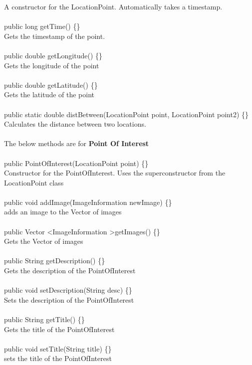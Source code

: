 \documentclass[12pt]{article}
\begin{document}
A constructor for the LocationPoint. Automatically takes a timestamp.~\\\\
public long getTime() \{\} ~\\
Gets the timestamp of the point. ~\\\\
public double getLongitude() \{\}~\\
Gets the longitude of the point ~\\\\
public double getLatitude() \{\} ~\\
Gets the latitude of the point~\\\\
public static double distBetween(LocationPoint point, LocationPoint point2) \{\} ~\\
Calculates the distance between two locations. ~\\\\
The below methods are for \textbf{Point Of Interest} ~\\\\
public PointOfInterest(LocationPoint point) \{\}~\\
Constructor for the PointOfInterest. Uses the superconstructor from the LocationPoint class ~\\\\
public void addImage(ImageInformation newImage) \{\}~\\ 
adds an image to the Vector of images~\\\\
public Vector \textless ImageInformation \textgreater getImages() \{\}~\\
Gets the Vector of images~\\\\
public String getDescription() \{\}~\\
Gets the description of the PointOfInterest ~\\\\
public void setDescription(String desc) \{\} ~\\
Sets the description of the PointOfInterest ~\\\\
public String getTitle() \{\} ~\\
Gets the title of the PointOfInterest ~\\\\
public void setTitle(String title) \{\}~\\
sets the title of the PointOfInterest ~\\\\
\end{document}
